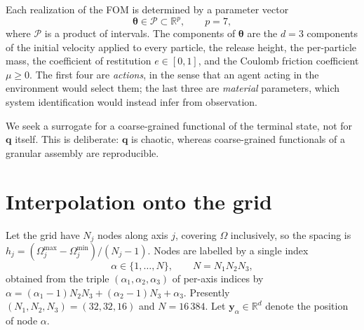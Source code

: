 \documentclass[11pt]{article}
\newcommand{\R}{\mathbb{R}}
\newcommand{\bs}[1]{\boldsymbol{#1}}
\begin{document}
Each realization of the FOM is determined by a parameter vector
\begin{equation}
  \bs{\theta} \in \mathcal{P} \subset \R^{p}, \qquad p = 7,
  \label{eq:theta}
\end{equation}
where $\mathcal{P}$ is a product of intervals. The components of $\bs{\theta}$ are the
$d = 3$ components of the initial velocity applied to every particle, the release height,
the per-particle mass, the coefficient of restitution $e \in [0,1]$, and the Coulomb
friction coefficient $\mu \geq 0$. The first four are \emph{actions}, in the sense that an
agent acting in the environment would select them; the last three are \emph{material}
parameters, which system identification would instead infer from observation.

We seek a surrogate for a coarse-grained functional of the terminal state, not for
$\bs{q}$ itself. This is deliberate: $\bs{q}$ is chaotic, whereas coarse-grained
functionals of a granular assembly are reproducible.

\section{Interpolation onto the grid}
\label{sec:encoder}

Let the grid have $N_j$ nodes along axis $j$, covering $\Omega$ inclusively, so the spacing
is $h_j = (\Omega_j^{\max} - \Omega_j^{\min})/(N_j - 1)$. Nodes are labelled by a single
index
\begin{equation}
  \alpha \in \{1, \ldots, N\}, \qquad N = N_1 N_2 N_3 ,
  \label{eq:node-index}
\end{equation}
obtained from the triple $(\alpha_1, \alpha_2, \alpha_3)$ of per-axis indices by
$\alpha = (\alpha_1 - 1) N_2 N_3 + (\alpha_2 - 1) N_3 + \alpha_3$. Presently
$(N_1, N_2, N_3) = (32, 32, 16)$ and $N = 16\,384$. Let $\bs{y}_\alpha \in \R^{d}$ denote
the position of node $\alpha$.
\end{document}
